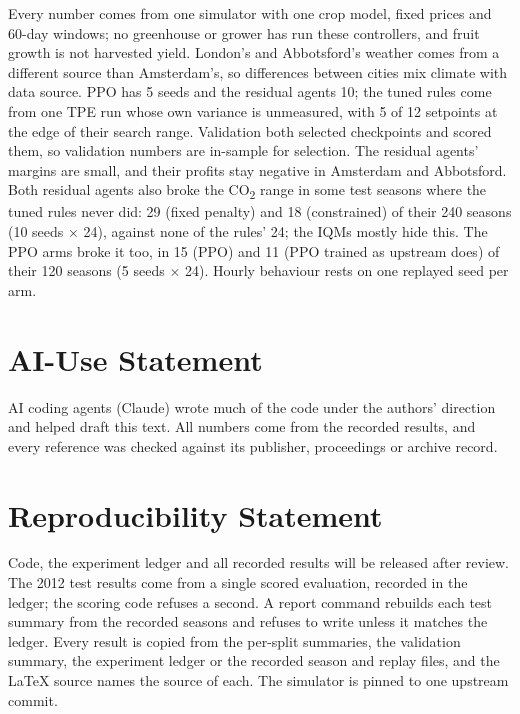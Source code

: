 \documentclass[letterpaper]{article} %
\newcommand{\cotwo}{CO\textsubscript{2}}
\begin{document}
Every number comes from one simulator with one crop model, fixed prices and 60-day windows; no greenhouse or grower has run these controllers, and fruit growth is not harvested yield. London's and Abbotsford's weather comes from a different source than Amsterdam's, so differences between cities mix climate with data source.
PPO has 5 seeds and the residual agents 10; the tuned rules come from one TPE run whose own variance is unmeasured, with 5 of 12 setpoints at the edge of their search range. Validation both selected checkpoints and scored them, so validation numbers are in-sample for selection.
The residual agents' margins are small, and their profits stay negative in Amsterdam and Abbotsford.
Both residual agents also broke the \cotwo{} range in some test seasons where the tuned rules never did: 29 (fixed penalty) and 18 (constrained) of their 240 seasons (10 seeds $\times$ 24), against none of the rules' 24; the IQMs mostly hide this. The PPO arms broke it too, in 15 (PPO) and 11 (PPO trained as upstream does) of their 120 seasons (5 seeds $\times$ 24). Hourly behaviour rests on one replayed seed per arm.

\section*{AI-Use Statement}
AI coding agents (Claude) wrote much of the code under the authors' direction and helped draft this text. All numbers come from the recorded results, and every reference was checked against its publisher, proceedings or archive record.

\section*{Reproducibility Statement}
Code, the experiment ledger and all recorded results will be released after review. The 2012 test results come from a single scored evaluation, recorded in the ledger; the scoring code refuses a second. A report command rebuilds each test summary from the recorded seasons and refuses to write unless it matches the ledger. Every result is copied from the per-split summaries, the validation summary, the experiment ledger or the recorded season and replay files, and the \LaTeX{} source names the source of each. The simulator is pinned to one upstream commit.


\end{document}

